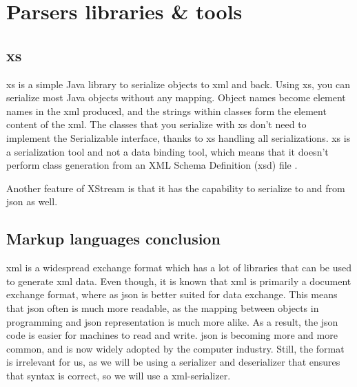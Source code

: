 \section{Parsers libraries \& tools}

\subsection{\gls{xs}}
\gls{xs} is a simple Java library to serialize objects to \gls{xml} and back. Using \gls{xs}, you can serialize most Java objects without any mapping. Object names become element names in the \gls{xml} produced, and the strings within classes form the element content of the \gls{xml}.
\newline
\newline
The classes that you serialize with \gls{xs} don't need to implement the Serializable interface, thanks to \gls{xs} handling all serializations. \gls{xs} is a serialization tool and not a data binding tool, which means that it doesn't perform class generation from an XML Schema Definition (\gls{xsd}) file \cite{bib:xstream} \cite{bib:ibm}.

Another feature of XStream is that it has the capability to serialize to and from \gls{json} as well.

\subsection{Markup languages conclusion}
\gls{xml} is a widespread exchange format which has a lot of libraries that can be used to generate \gls{xml} data. Even though, it is known that \gls{xml} is primarily a document exchange format, where as \gls{json} is better suited for data exchange. This means that \gls{json} often is much more readable, as the mapping between objects in programming and \gls{json} representation is much more alike. As a result, the \gls{json} code is easier for machines to read and write. \gls{json} is becoming more and more common, and is now widely adopted by the computer industry. Still, the format is irrelevant for us, as we will be using a serializer and deserializer that ensures that syntax is correct, so we will use a \gls{xml}-serializer. 